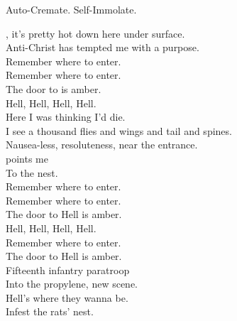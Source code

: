 Auto-Cremate. Self-Immolate. \\





, it's pretty hot down here under surface. \\
Anti-Christ has tempted me with a purpose. \\

Remember where to enter. \\
Remember where to enter. \\
The door to  is amber. \\

Hell, Hell, Hell, Hell. \\

Here I was thinking I'd die. \\
I see a thousand flies and wings and tail and spines. \\

Nausea-less, resoluteness, near the entrance. \\
 points me \\
To the  nest. \\

Remember where to enter.\\
Remember where to enter. \\
The door to Hell is amber. \\

Hell, Hell, Hell, Hell. \\

Remember where to enter. \\
The door to Hell is amber. \\

Fifteenth infantry paratroop \\
Into the propylene, new scene. \\
Hell's where they wanna be. \\
Infest the rats' nest. \\
